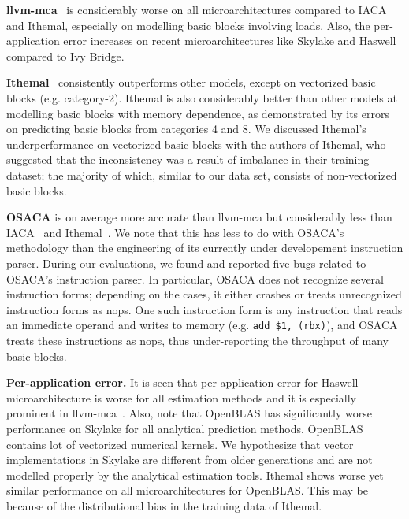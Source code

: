     \textbf{llvm-mca}~\cite{llvm-mca} is considerably worse on all microarchitectures compared to IACA and Ithemal,
especially on modelling basic blocks involving loads. Also, the per-application error increases on recent microarchitectures like Skylake and Haswell compared to Ivy Bridge.

\textbf{Ithemal}~\cite{ithemal} consistently outperforms other models, except on vectorized basic blocks (e.g. category-2).
Ithemal is also considerably better than other models at modelling basic blocks with memory dependence,
as demonstrated by its errors on predicting basic blocks from categories 4 and 8.
We discussed Ithemal's underperformance on vectorized basic blocks with the authors of Ithemal, who suggested that the inconsistency
was a result of imbalance in their training dataset;
the majority of which, similar to our data set, consists of non-vectorized basic blocks.

\textbf{OSACA}\cite{osaca} is on average more accurate than llvm-mca but
considerably less than IACA~\cite{iaca} and Ithemal~\cite{ithemal}.
We note that this has less to do with OSACA's methodology than the engineering of its currently under developement instruction parser.
During our evaluations, we found and reported five bugs related to OSACA's instruction parser.
In particular, OSACA does not recognize several instruction forms;
depending on the cases, it either crashes or treats unrecognized instruction forms as nops.
One such instruction form is any instruction that reads an immediate operand and writes to memory
(e.g. \verb|add $1, (rbx)|), and OSACA treats these instructions as nops, thus under-reporting the throughput of
many basic blocks.

\textbf{Per-application error.} It is seen that per-application error for Haswell microarchitecture is worse for all estimation methods and it is especially prominent in llvm-mca~\cite{llvm-mca}. Also, note that OpenBLAS has significantly worse performance on Skylake for all analytical prediction methods. OpenBLAS contains lot of vectorized numerical kernels. We hypothesize that vector implementations in Skylake are different from older generations and are not modelled properly by the analytical estimation tools. Ithemal shows worse yet  similar performance on all microarchitectures for OpenBLAS. This may be because of the distributional bias in the training data of Ithemal.

